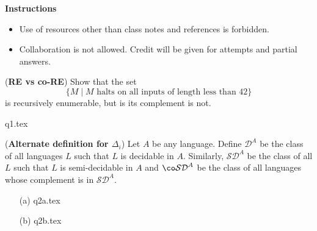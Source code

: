 \documentclass[12pt, a4paper,answers]{exam}
\renewcommand{\D}{\mathcal{D}}
\newcommand{\SD}{\mathcal{SD}}
\begin{document}
\textbf{Instructions}
\begin{itemize}   \setlength\itemsep{0.1mm}
	\item {\sf  Use of resources other than class notes and references is forbidden.}
	\item {\sf Collaboration is not allowed. Credit will be given for attempts and partial answers.}
\end{itemize}


\begin{questions}

\question[10] (\textbf{RE vs co-RE}) Show that the set \[ \{M \mid M \text{ halts on all inputs of length less than $42$}\}\] is recursively enumerable, but is its complement is not.

\begin{solution}
	{q1.tex}
\end{solution}

	\question[10] (\textbf{Alternate definition for $\Delta_i$}) Let $A$ be any language. Define $\D^A$ be the class of all languages $L$ such that $L$ is decidable in $A$. Similarly, $\SD^A$ be the class of all $L$ such that $L$ is semi-decidable in $A$ and $\co\SD^A $ be the class of all languages whose complement is in $\SD^A$.
	

\begin{solution}
	\begin{enumerate}
		\item[(a)] {q2a.tex}
		\item[(b)] {q2b.tex}
	\end{enumerate}
\end{solution}


\end{questions}
\end{document}
